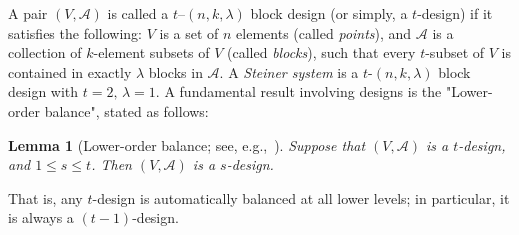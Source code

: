 \documentclass[conference,letterpaper]{IEEEtran}
\newtheorem{lemma}{Lemma}
\begin{document}
A pair \( (V, \mathcal{A}) \) is called a \( t\text{--}(n,k,\lambda) \) block design (or simply, a \( t \)-design) if it satisfies the following: \( V \) is a set of \( n \) elements (called \emph{points}), and \( \mathcal{A} \) is a collection of \( k \)-element subsets of \( V \) (called \emph{blocks}), such that every \( t \)-subset of \( V \) is contained in exactly \( \lambda \) blocks in \( \mathcal{A} \). A \emph{Steiner system} is a $t$-$(n,k,\lambda)$ block design with $t=2,\, \lambda=1$. A fundamental result involving designs is the "Lower-order balance", stated as follows:
\begin{lemma}[Lower-order balance; see, e.g.,{~\cite[Corollary 9.6]{CombiDesigns:books/daglib/Stinson04}}]
    Suppose that $(V, \mathcal{A})$ is a $t$-design, and $1 \le s \le t$. Then $(V, \mathcal{A})$ is a $s$-design.
    \label{thm:lower_balance}
\end{lemma}
That is, any $t$-design is automatically balanced at all lower levels; in particular, it is always a $(t-1)$-design.
\end{document}
